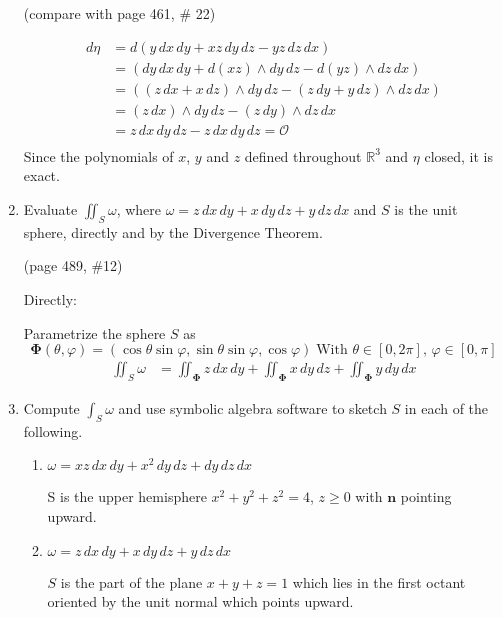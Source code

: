 \documentclass{article}
\begin{document}
\begin{enumerate}
    (compare with page 461, \# 22)

    \begin{align*}
        d\eta &= d (y\, dx \, dy + xz \, dy \, dz - yz \, dz \, dx) \\
        &= (dy \, dx \, dy + d(xz)\wedge  dy \, dz - d(yz) \wedge dz \, dx) \\
        &= ((z \, dx + x \, dz)\wedge  dy \, dz - (z\, dy + y \, dz) \wedge dz \, dx) \\
        &= (z \, dx) \wedge dy \, dz - (z\, dy) \wedge dz \, dx \\
        &= z \, dx \, dy \, dz - z \, dx \, dy \, dz = \mathcal{O}\\
    \end{align*}
    Since the polynomials of $x$, $y$ and $z$ defined throughout $\mathbb{R}^3$ and $\eta$ closed, it is exact.
    \newpage
    \item
    Evaluate $\displaystyle \iint_S \omega$, where $\omega = z\, dx \, dy + x \, dy \, dz + y \, dz \, dx$ and $S$ is the unit sphere, directly and by the Divergence Theorem.

    (page 489, \#12)

    Directly: 
    
    Parametrize the sphere $S$ as 
    \[ \boldsymbol \Phi (\theta, \varphi) = ( \cos\theta \sin\varphi , \sin\theta \sin\varphi, \cos\varphi)\; \text{With }\theta \in [0,2\pi],\, \varphi \in [0,\pi] \]
    \begin{align*}
        \iint_S \omega &= \iint_{\boldsymbol \Phi} z \, dx \, dy + \iint_{\boldsymbol \Phi} x \, dy \, dz + \iint_{\boldsymbol \Phi} y \, dy \, dx
    \end{align*}

    \newpage
    \item Compute $\displaystyle \int_S \omega$ and use symbolic algebra software to sketch $S$ in each of the following.
    \begin{enumerate}
        \item $\omega = xz \, dx \, dy + x^2 \, dy \, dz + dy \, dz \, dx$
        
        S is the upper hemisphere $x^2 + y^2 + z^2 = 4$, $z \geq 0$ with $\boldsymbol n$ pointing upward.


        \item $\omega = z \, dx \, dy + x \, dy \, dz + y \, dz \, dx$

        $S$ is the part of the plane $x+y+z = 1$ which lies in the first octant oriented by the unit normal which points upward.


\end{enumerate}
\end{enumerate}
\end{document}
